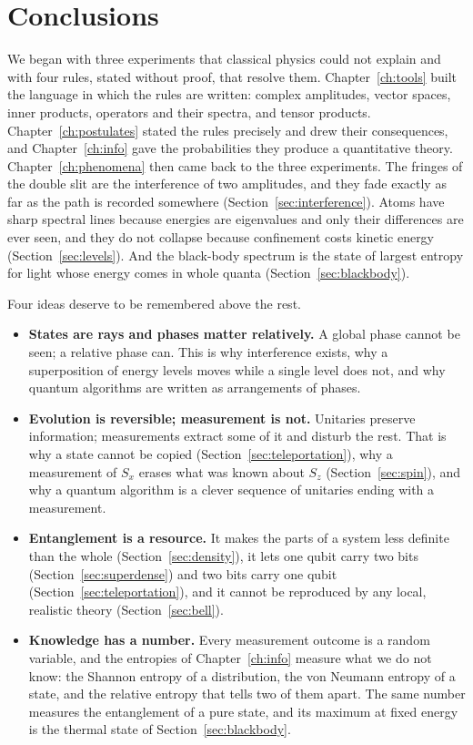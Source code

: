 \chapter*{Conclusions}

We began with three experiments that classical physics could not explain and with four rules, stated without proof, that resolve them. Chapter~\ref{ch:tools} built the language in which the rules are written: complex amplitudes, vector spaces, inner products, operators and their spectra, and tensor products. Chapter~\ref{ch:postulates} stated the rules precisely and drew their consequences, and Chapter~\ref{ch:info} gave the probabilities they produce a quantitative theory. Chapter~\ref{ch:phenomena} then came back to the three experiments. The fringes of the double slit are the interference of two amplitudes, and they fade exactly as far as the path is recorded somewhere (Section~\ref{sec:interference}). Atoms have sharp spectral lines because energies are eigenvalues and only their differences are ever seen, and they do not collapse because confinement costs kinetic energy (Section~\ref{sec:levels}). And the black-body spectrum is the state of largest entropy for light whose energy comes in whole quanta (Section~\ref{sec:blackbody}).

Four ideas deserve to be remembered above the rest.

\begin{itemize}
  \item \textbf{States are rays and phases matter relatively.} A global phase cannot be seen; a relative phase can. This is why interference exists, why a superposition of energy levels moves while a single level does not, and why quantum algorithms are written as arrangements of phases.
  \item \textbf{Evolution is reversible; measurement is not.} Unitaries preserve information; measurements extract some of it and disturb the rest. That is why a state cannot be copied (Section~\ref{sec:teleportation}), why a measurement of $S_x$ erases what was known about $S_z$ (Section~\ref{sec:spin}), and why a quantum algorithm is a clever sequence of unitaries ending with a measurement.
  \item \textbf{Entanglement is a resource.} It makes the parts of a system less definite than the whole (Section~\ref{sec:density}), it lets one qubit carry two bits (Section~\ref{sec:superdense}) and two bits carry one qubit (Section~\ref{sec:teleportation}), and it cannot be reproduced by any local, realistic theory (Section~\ref{sec:bell}).
  \item \textbf{Knowledge has a number.} Every measurement outcome is a random variable, and the entropies of Chapter~\ref{ch:info} measure what we do not know: the Shannon entropy of a distribution, the von Neumann entropy of a state, and the relative entropy that tells two of them apart. The same number measures the entanglement of a pure state, and its maximum at fixed energy is the thermal state of Section~\ref{sec:blackbody}.
\end{itemize}

